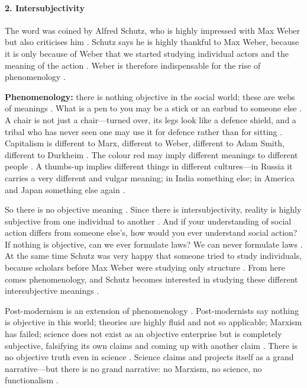 \paragraph{2. Intersubjectivity}
The word was coined by Alfred Schutz, who is highly impressed with Max Weber but also criticises him .
Schutz says he is highly thankful to Max Weber, because it is only because of Weber that we started studying individual actors and the meaning of the action . Weber is therefore indispensable for the rise of phenomenology .

\textbf{Phenomenology:} there is nothing objective in the social world; these are webs of meanings .
What is a pen to you may be a stick or an earbud to someone else . A chair is not just a chair---turned over, its legs look like a defence shield, and a tribal who has never seen one may use it for defence rather than for sitting .
Capitalism is different to Marx, different to Weber, different to Adam Smith, different to Durkheim . The colour red may imply different meanings to different people . A thumbs-up implies different things in different cultures---in Russia it carries a very different and vulgar meaning; in India something else; in America and Japan something else again .

So there is no objective meaning . Since there is intersubjectivity, reality is highly subjective from one individual to another . And if your understanding of social action differs from someone else's, how would you ever understand social action? If nothing is objective, can we ever formulate laws? We can never formulate laws .
At the same time Schutz was very happy that someone tried to study individuals, because scholars before Max Weber were studying only structure . From here comes phenomenology, and Schutz becomes interested in studying these different intersubjective meanings .

\begin{CriticalPoint}
Post-modernism is an extension of phenomenology . Post-modernists say nothing is objective in this world; theories are highly fluid and not so applicable; Marxism has failed; science does not exist as an objective enterprise but is completely subjective, falsifying its own claims and coming up with another claim .
There is no objective truth even in science . Science claims and projects itself as a grand narrative---but there is no grand narrative: no Marxism, no science, no functionalism .
\end{CriticalPoint}

